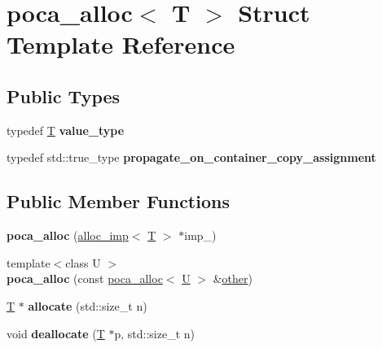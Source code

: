 \hypertarget{structpoca__alloc}{}\section{poca\+\_\+alloc$<$ T $>$ Struct Template Reference}
\label{structpoca__alloc}
\subsection*{Public Types}
\begin{DoxyCompactItemize}
\item 
\mbox{\label{structpoca__alloc_a8cb1a00b74d75199f5ca2db0cccaf973}} 
typedef \mbox{\hyperlink{struct_t}{T}} {\bfseries value\+\_\+type}
\item 
\mbox{\label{structpoca__alloc_a21af439788f110d8630a2146901b7446}} 
typedef std\+::true\+\_\+type {\bfseries propagate\+\_\+on\+\_\+container\+\_\+copy\+\_\+assignment}
\end{DoxyCompactItemize}
\subsection*{Public Member Functions}
\begin{DoxyCompactItemize}
\item 
\mbox{\label{structpoca__alloc_a8705b5a486ab4c840a3e80cc867b7b08}} 
{\bfseries poca\+\_\+alloc} (\mbox{\hyperlink{structalloc__imp}{alloc\+\_\+imp}}$<$ \mbox{\hyperlink{struct_t}{T}} $>$ $\ast$imp\+\_\+)
\item 
\mbox{\label{structpoca__alloc_ad7497c5b2b858f58073c6e9c18c8cbe2}} 
{\footnotesize template$<$class U $>$ }\\{\bfseries poca\+\_\+alloc} (const \mbox{\hyperlink{structpoca__alloc}{poca\+\_\+alloc}}$<$ \mbox{\hyperlink{union_u}{U}} $>$ \&\mbox{\hyperlink{structother}{other}})
\item 
\mbox{\label{structpoca__alloc_a43bebfd159aae4d6d3bcde08c5785caf}} 
\mbox{\hyperlink{struct_t}{T}} $\ast$ {\bfseries allocate} (std\+::size\+\_\+t n)
\item 
\mbox{\label{structpoca__alloc_a4528ab4065f7554bfdfb5d3714f47666}} 
void {\bfseries deallocate} (\mbox{\hyperlink{struct_t}{T}} $\ast$p, std\+::size\+\_\+t n)
\end{DoxyCompactItemize}
